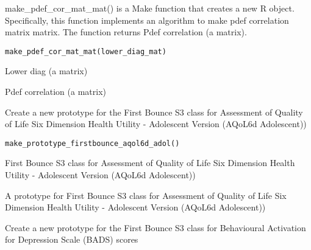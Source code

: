 \documentclass[a4paper]{book}
\begin{document}
%
\begin{Description}\relax
make\_pdef\_cor\_mat\_mat() is a Make function that creates a new R object. Specifically, this function implements an algorithm to make pdef correlation matrix matrix. The function returns Pdef correlation (a matrix).
\end{Description}
%
\begin{Usage}
\begin{verbatim}
make_pdef_cor_mat_mat(lower_diag_mat)
\end{verbatim}
\end{Usage}
%
\begin{Arguments}
\begin{ldescription}
\item[\code{lower\_diag\_mat}] Lower diag (a matrix)
\end{ldescription}
\end{Arguments}
%
\begin{Value}
Pdef correlation (a matrix)
\end{Value}
%
\begin{Description}\relax
Create a new prototype for the First Bounce S3 class for Assessment of Quality of Life Six Dimension Health Utility - Adolescent Version (AQoL6d Adolescent))
\end{Description}
%
\begin{Usage}
\begin{verbatim}
make_prototype_firstbounce_aqol6d_adol()
\end{verbatim}
\end{Usage}
%
\begin{Details}\relax
First Bounce S3 class for Assessment of Quality of Life Six Dimension Health Utility - Adolescent Version (AQoL6d Adolescent))
\end{Details}
%
\begin{Value}
A prototype for First Bounce S3 class for Assessment of Quality of Life Six Dimension Health Utility - Adolescent Version (AQoL6d Adolescent))
\end{Value}
%
\begin{Description}\relax
Create a new prototype for the First Bounce S3 class for Behavioural Activation for Depression Scale (BADS) scores
\end{Description}
\end{document}
